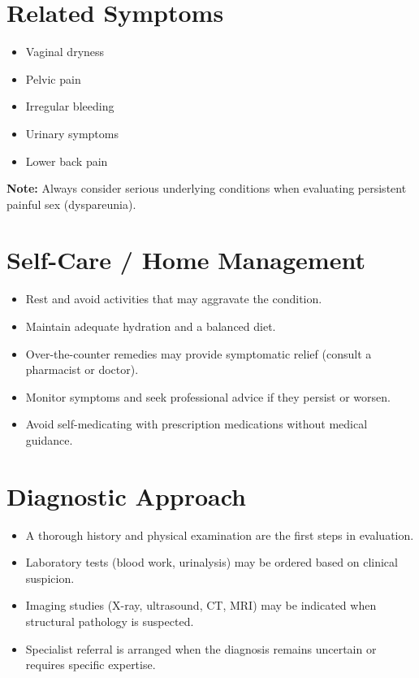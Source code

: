 \section*{Related Symptoms}
\begin{itemize}
  \item Vaginal dryness
  \item Pelvic pain
  \item Irregular bleeding
  \item Urinary symptoms
  \item Lower back pain
\end{itemize}
\textbf{Note:} Always consider serious underlying conditions when evaluating persistent painful sex (dyspareunia).

\section*{Self-Care / Home Management}
\begin{itemize}
  \item Rest and avoid activities that may aggravate the condition.
  \item Maintain adequate hydration and a balanced diet.
  \item Over-the-counter remedies may provide symptomatic relief (consult a pharmacist or doctor).
  \item Monitor symptoms and seek professional advice if they persist or worsen.
  \item Avoid self-medicating with prescription medications without medical guidance.
\end{itemize}

\section*{Diagnostic Approach}
\begin{itemize}
  \item A thorough history and physical examination are the first steps in evaluation.
  \item Laboratory tests (blood work, urinalysis) may be ordered based on clinical suspicion.
  \item Imaging studies (X-ray, ultrasound, CT, MRI) may be indicated when structural pathology is suspected.
  \item Specialist referral is arranged when the diagnosis remains uncertain or requires specific expertise.
\end{itemize}

